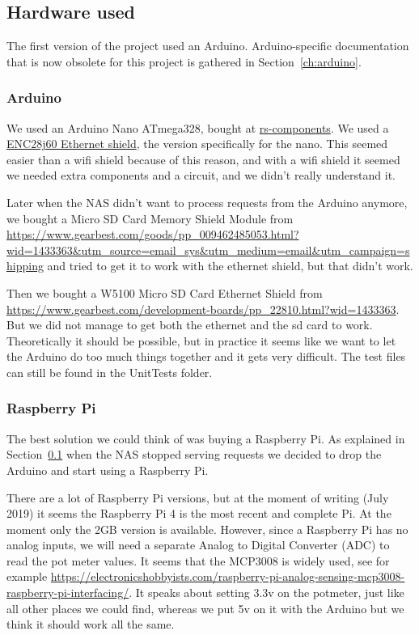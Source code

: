 \subsection{Hardware used}\label{subsec:hardwareUsed}

The first version of the project used an Arduino.
Arduino-specific documentation that is now obsolete for this project is gathered in Section~\ref{ch:arduino}.

\subsubsection{Arduino}
We used an Arduino Nano ATmega328, bought at \href{http://nl.rs-online.com/}{rs-components}.
We used a \href{http://www.mijn-gadgets.nl/Webwinkel-Product-157562595/ENC28J60-Ethernet-Shield-Network-Module-V1.0-For-Arduino-Nano.html}{ENC28j60 Ethernet shield}, the version specifically for the nano.
This seemed easier than a wifi shield because of this reason, and with a wifi shield it seemed we needed extra components and a circuit, and we didn't really understand it.

Later when the NAS didn't want to process requests from the Arduino anymore, we bought a Micro SD Card Memory Shield Module from \url{https://www.gearbest.com/goods/pp_009462485053.html?wid=1433363&utm_source=email_sys&utm_medium=email&utm_campaign=shipping} and tried to get it to work with the ethernet shield, but that didn't work.

Then we bought a W5100 Micro SD Card Ethernet Shield from \url{https://www.gearbest.com/development-boards/pp_22810.html?wid=1433363}.
But we did not manage to get both the ethernet and the sd card to work.
Theoretically it should be possible, but in practice it seems like we want to let the Arduino do too much things together and it gets very difficult.
The test files can still be found in the UnitTests folder.

\subsubsection{Raspberry Pi}
The best solution we could think of was buying a Raspberry Pi.
As explained in Section~\ref{subsec:hardwareUsed} when the NAS stopped serving requests we decided to drop the Arduino and start using a Raspberry Pi.

There are a lot of Raspberry Pi versions, but at the moment of writing (July 2019) it seems the Raspberry Pi 4 is the most recent and complete Pi.
At the moment only the 2GB version is available.
However, since a Raspberry Pi has no analog inputs, we will need a separate Analog to Digital Converter (ADC) to read the pot meter values.
It seems that the MCP3008 is widely used, see for example \url{https://electronicshobbyists.com/raspberry-pi-analog-sensing-mcp3008-raspberry-pi-interfacing/}.
It speaks about setting 3.3v on the potmeter, just like all other places we could find, whereas we put 5v on it with the Arduino but we think it should work all the same.

